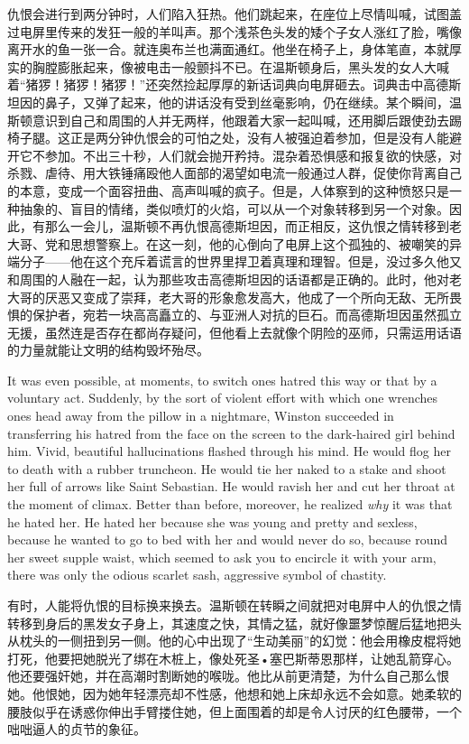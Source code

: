 \begin{paracol}{2}
仇恨会进行到两分钟时，人们陷入狂热。他们跳起来，在座位上尽情叫喊，试图盖过电屏里传来的发狂一般的羊叫声。那个浅茶色头发的矮个子女人涨红了脸，嘴像离开水的鱼一张一合。就连奥布兰也满面通红。他坐在椅子上，身体笔直，本就厚实的胸膛膨胀起来，像被电击一般颤抖不已。在温斯顿身后，黑头发的女人大喊着``猪猡！猪猡！猪猡！''还突然捡起厚厚的新话词典向电屏砸去。词典击中高德斯坦因的鼻子，又弹了起来，他的讲话没有受到丝毫影响，仍在继续。某个瞬间，温斯顿意识到自己和周围的人并无两样，他跟着大家一起叫喊，还用脚后跟使劲去踢椅子腿。这正是两分钟仇恨会的可怕之处，没有人被强迫着参加，但是没有人能避开它不参加。不出三十秒，人们就会抛开矜持。混杂着恐惧感和报复欲的快感，对杀戮、虐待、用大铁锤痛殴他人面部的渴望如电流一般通过人群，促使你背离自己的本意，变成一个面容扭曲、高声叫喊的疯子。但是，人体察到的这种愤怒只是一种抽象的、盲目的情绪，类似喷灯的火焰，可以从一个对象转移到另一个对象。因此，有那么一会儿，温斯顿不再仇恨高德斯坦因，而正相反，这仇恨之情转移到老大哥、党和思想警察上。在这一刻，他的心倒向了电屏上这个孤独的、被嘲笑的异端分子——他在这个充斥着谎言的世界里捍卫着真理和理智。但是，没过多久他又和周围的人融在一起，认为那些攻击高德斯坦因的话语都是正确的。此时，他对老大哥的厌恶又变成了崇拜，老大哥的形象愈发高大，他成了一个所向无敌、无所畏惧的保护者，宛若一块高高矗立的、与亚洲人对抗的巨石。而高德斯坦因虽然孤立无援，虽然连是否存在都尚存疑问，但他看上去就像个阴险的巫师，只需运用话语的力量就能让文明的结构毁坏殆尽。

\switchcolumn*

It was even possible, at moments, to switch one\textquotesingle s hatred
this way or that by a voluntary act. Suddenly, by the sort of violent
effort with which one wrenches one\textquotesingle s head away from the
pillow in a nightmare, Winston succeeded in transferring his hatred from
the face on the screen to the dark-haired girl behind him. Vivid,
beautiful hallucinations flashed through his mind. He would flog her to
death with a rubber truncheon. He would tie her naked to a stake and
shoot her full of arrows like Saint Sebastian. He would ravish her and
cut her throat at the moment of climax. Better than before, moreover, he
realized \emph{why} it was that he hated her. He hated her because she
was young and pretty and sexless, because he wanted to go to bed with
her and would never do so, because round her sweet supple waist, which
seemed to ask you to encircle it with your arm, there was only the
odious scarlet sash, aggressive symbol of chastity.

\switchcolumn

有时，人能将仇恨的目标换来换去。温斯顿在转瞬之间就把对电屏中人的仇恨之情转移到身后的黑发女子身上，其速度之快，其情之猛，就好像噩梦惊醒后猛地把头从枕头的一侧扭到另一侧。他的心中出现了``生动美丽''的幻觉：他会用橡皮棍将她打死，他要把她脱光了绑在木桩上，像处死圣•塞巴斯蒂恩那样，让她乱箭穿心。他还要强奸她，并在高潮时割断她的喉咙。他比从前更清楚，为什么自己那么恨她。他恨她，因为她年轻漂亮却不性感，他想和她上床却永远不会如意。她柔软的腰肢似乎在诱惑你伸出手臂搂住她，但上面围着的却是令人讨厌的红色腰带，一个咄咄逼人的贞节的象征。


\end{paracol}

